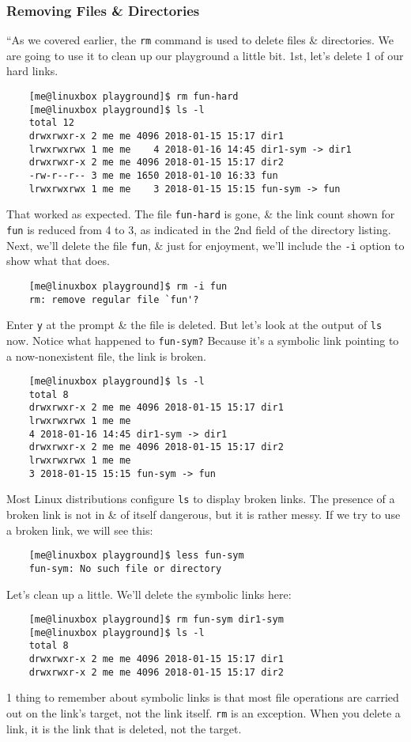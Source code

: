 \documentclass[oneside]{book}
\numberwithin{equation}{section}
\begin{document}
\subsubsection{Removing Files \& Directories}
``As we covered earlier, the \texttt{rm} command is used to delete files \& directories. We are going to use it to clean up our playground a little bit. 1st, let's delete 1 of our hard links.
\begin{verbatim}
	[me@linuxbox playground]$ rm fun-hard
	[me@linuxbox playground]$ ls -l
	total 12
	drwxrwxr-x 2 me me 4096 2018-01-15 15:17 dir1
	lrwxrwxrwx 1 me me    4 2018-01-16 14:45 dir1-sym -> dir1
	drwxrwxr-x 2 me me 4096 2018-01-15 15:17 dir2
	-rw-r--r-- 3 me me 1650 2018-01-10 16:33 fun
	lrwxrwxrwx 1 me me    3 2018-01-15 15:15 fun-sym -> fun
\end{verbatim}
That worked as expected. The file \texttt{fun-hard} is gone, \& the link count shown for \texttt{fun} is reduced from 4 to 3, as indicated in the 2nd field of the directory listing. Next, we'll delete the file \texttt{fun}, \& just for enjoyment, we'll include the \texttt{-i} option to show what that does.
\begin{verbatim}
	[me@linuxbox playground]$ rm -i fun
	rm: remove regular file `fun'?
\end{verbatim}
Enter \texttt{y} at the prompt \& the file is deleted. But let's look at the output of \texttt{ls} now. Notice what happened to \texttt{fun-sym?} Because it's a symbolic link pointing to a now-nonexistent file, the link is broken.
\begin{verbatim}
	[me@linuxbox playground]$ ls -l
	total 8
	drwxrwxr-x 2 me me 4096 2018-01-15 15:17 dir1
	lrwxrwxrwx 1 me me
	4 2018-01-16 14:45 dir1-sym -> dir1
	drwxrwxr-x 2 me me 4096 2018-01-15 15:17 dir2
	lrwxrwxrwx 1 me me
	3 2018-01-15 15:15 fun-sym -> fun
\end{verbatim}
Most Linux distributions configure \texttt{ls} to display broken links. The presence of a broken link is not in \& of itself dangerous, but it is rather messy. If we try to use a broken link, we will see this:
\begin{verbatim}
	[me@linuxbox playground]$ less fun-sym
	fun-sym: No such file or directory
\end{verbatim}
Let's clean up a little. We'll delete the symbolic links here:
\begin{verbatim}
	[me@linuxbox playground]$ rm fun-sym dir1-sym
	[me@linuxbox playground]$ ls -l
	total 8
	drwxrwxr-x 2 me me 4096 2018-01-15 15:17 dir1
	drwxrwxr-x 2 me me 4096 2018-01-15 15:17 dir2
\end{verbatim}
1 thing to remember about symbolic links is that most file operations are carried out on the link's target, not the link itself. \texttt{rm} is an exception. When you delete a link, it is the link that is deleted, not the target.
\end{document}
